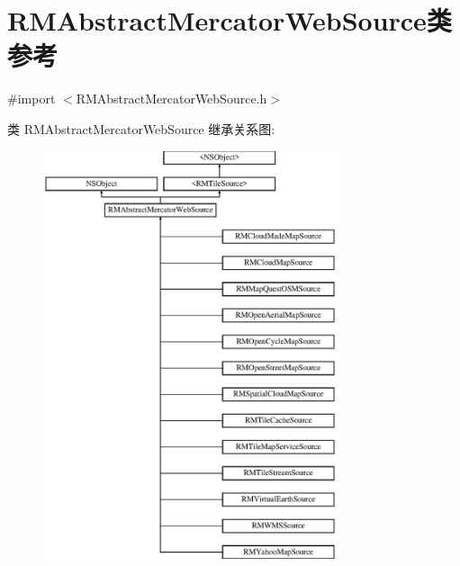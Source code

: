 \hypertarget{interface_r_m_abstract_mercator_web_source}{\section{R\-M\-Abstract\-Mercator\-Web\-Source类 参考}
\label{interface_r_m_abstract_mercator_web_source}
}


{\ttfamily \#import $<$R\-M\-Abstract\-Mercator\-Web\-Source.\-h$>$}

类 R\-M\-Abstract\-Mercator\-Web\-Source 继承关系图\-:\begin{figure}[H]
\begin{center}
\leavevmode
\includegraphics[height=12.000000cm]{interface_r_m_abstract_mercator_web_source}
\end{center}
\end{figure}
